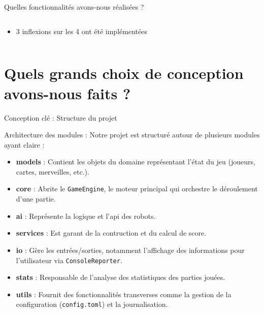 \documentclass[10pt,french]{beamer}
\begin{document}
\begin{frame}{Quelles fonctionnalités avons-nous réalisées ?}
\begin{columns}
\begin{column}{0.5\textwidth}
\begin{itemize}
\begin{itemize}
                    \item 2 robots \textit{intelligents} choisissant les cartes en fonction du cours de la partie
                    \item 1 robot « \textit{meta} » se servant des stratégies spécialistes 
                  \end{itemize}
                \item 3 inflexions sur les 4 ont été implémentées
            \end{itemize}
        \end{column}
    \end{columns}
\end{frame}

\section{Quels grands choix de conception avons-nous faits ?}

 \begin{frame}{Conception clé : Structure du projet}
       \begin{block}{Architecture des modules :}
           Notre projet est structuré autour de plusieurs modules ayant claire :
           \begin{itemize}
               \item \textbf{models} : Contient les objets du domaine représentant l'état du jeu (joueurs, cartes, merveilles, etc.). 
               \item \textbf{core} : Abrite le \texttt{GameEngine}, le moteur principal qui orchestre le déroulement d'une partie.
               \item \textbf{ai} : Représente la logique et l'api des robots.
               \item \textbf{services} : Est garant de la contruction et du calcul de score.
               \item \textbf{io} : Gère les entrées/sorties, notamment l'affichage des informations pour l'utilisateur via \texttt{ConsoleReporter}.
               \item \textbf{stats} : Responsable de l'analyse des statistiques des parties jouées.
               \item \textbf{utils} : Fournit des fonctionnalités transverses comme la gestion de la configuration (\texttt{config.toml}) et la journalisation.
           \end{itemize}
       \end{block}
   \end{frame}
\end{document}
